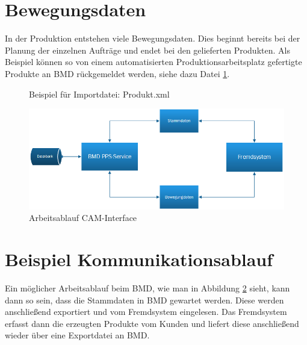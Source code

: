 \section{Bewegungsdaten}
In der Produktion entstehen viele Bewegungsdaten. Dies beginnt bereits bei der Planung der einzelnen Aufträge und endet bei den gelieferten Produkten. Als Beispiel können so von einem automatisierten Produktionsarbeitsplatz gefertigte Produkte an BMD rückgemeldet werden, siehe dazu Datei \ref{fig:ProduktImp}. 

\begin{figure}
\centering
{}
    
\caption{Beispiel für Importdatei: Produkt.xml }
\label{fig:ProduktImp}
\end{figure}

\begin{figure}
    \centering
    \includegraphics[width=.95\textwidth]{images/Systemschema.png}
    \caption{Arbeitsablauf CAM-Interface}
    \label{fig:Arbeitsablauf}
\end{figure}

\section{Beispiel Kommunikationsablauf}
Ein möglicher Arbeitsablauf beim BMD, wie man in Abbildung \ref{fig:Arbeitsablauf} sieht, kann dann so sein, dass die Stammdaten in BMD gewartet werden. Diese werden anschließend exportiert und vom Fremdsystem eingelesen. Das Fremdsystem erfasst dann die erzeugten Produkte vom Kunden und liefert diese anschließend wieder über eine Exportdatei an BMD. 
